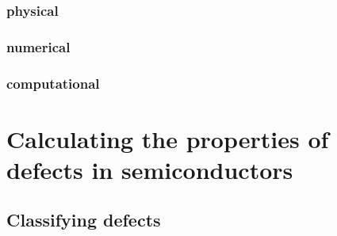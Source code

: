 \subsubsection{physical}


\subsubsection{numerical}


\subsubsection{computational}


\clearpage

\section{Calculating the properties of defects in semiconductors}



\subsection{Classifying defects}





